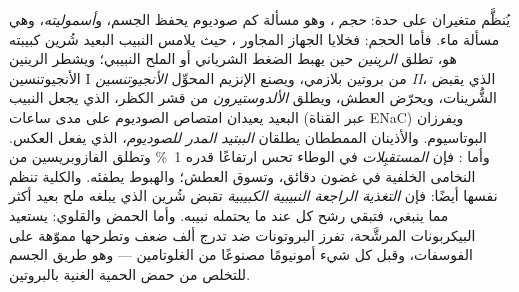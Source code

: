 \begin{definition}\label{def:b3:renal-osmoregulation:controls}
يُنظَّم متغيران على حدة: \emph{حجم} ، وهو
مسألة كم صوديوم يحفظ الجسم، و\emph{أسموليته}، وهي مسألة ماء.
فأما الحجم: فخلايا الجهاز المجاور ، حيث يلامس النبيب
البعيد شُرين كبيبته هو، تطلق \emph{الرينين} حين يهبط الضغط
الشرياني أو الملح النبيبي؛ ويشطر الرينين الأنجيوتنسين I من
بروتين بلازمي، ويصنع الإنزيم المحوِّل \emph{الأنجيوتنسين II}،
الذي يقبض الشُّرينات، ويحرّض العطش، ويطلق \emph{الألدوستيرون}
من قشر الكظر، الذي يجعل النبيب البعيد  يعيدان
امتصاص الصوديوم على مدى ساعات (عبر القناة ENaC) ويفرزان
البوتاسيوم. والأذينان الممططان يطلقان \emph{الببتيد المدر
للصوديوم}، الذي يفعل العكس. وأما : فإن \emph{المستقبِلات
} في الوطاء تحس ارتفاعًا قدره \qty{1}{\%} وتطلق
الفازوبريسين من النخامى الخلفية في غضون دقائق، وتسوق العطش؛
والهبوط يطفئه. والكلية تنظم نفسها أيضًا: فإن \emph{التغذية
الراجعة النبيبية الكبيبية} تقبض شُرين  الذي يبلغه ملح
بعيد أكثر مما ينبغي، فتبقي رشح كل  عند ما يحتمله نبيبه.
وأما الحمض والقلوي:  يستعيد البيكربونات
المرشَّحة،  تفرز البروتونات ضد تدرج ألف ضعف
وتطرحها مموّهة على الفوسفات، وقبل كل شيء أمونيومًا مصنوعًا
من الغلوتامين --- وهو طريق الجسم للتخلص من حمض الحمية
الغنية بالبروتين.
\end{definition}

